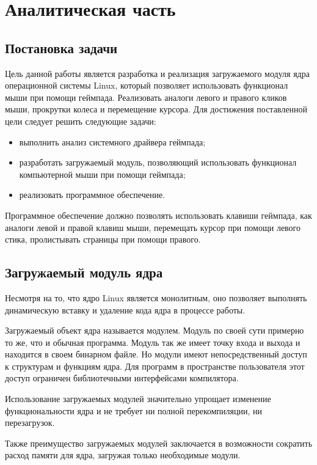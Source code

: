 \section{Аналитическая часть}
\subsection{Постановка задачи}
Цель данной работы является разработка и реализация загружаемого
модуля ядра операционной системы Linux, который позволяет использовать функционал мыши при помощи геймпада. Реализовать аналоги левого и правого кликов мыши, прокрутки колеса и перемещение курсора. Для достижения
поставленной цели следует решить следующие задачи:
\begin{itemize}
	\item выполнить анализ системного драйвера геймпада;
	\item разработать загружаемый модуль, позволяющий использовать функционал компьютерной мыши
	при помощи геймпада;
	\item реализовать программное обеспечение.
\end{itemize}
Программное обеспечение должно позволять использовать клавиши геймпада, как аналоги левой и правой клавиш мыши, перемещать курсор при помощи левого стика, пролистывать страницы при помощи правого.\par

\subsection{Загружаемый модуль ядра}
Несмотря на то, что ядро Linux является монолитным, оно позволяет
выполнять динамическую вставку и удаление кода ядра в процессе работы.\par
Загружаемый объект ядра называется модулем. Модуль по своей сути примерно то же, что и обычная программа. Модуль
так же имеет точку входа и выхода и находится в своем бинарном файле. Но
модули имеют непосредственный доступ к структурам и функциям ядра. Для
программ в пространстве пользователя этот доступ ограничен библиотечными
интерфейсами компилятора.\par
Использование загружаемых модулей значительно упрощает изменение
функциональности ядра и не требует ни полной перекомпиляции, ни перезагрузок.\par
Также преимущество загружаемых модулей заключается в возможности сократить расход памяти для ядра, загружая только
необходимые модули.

